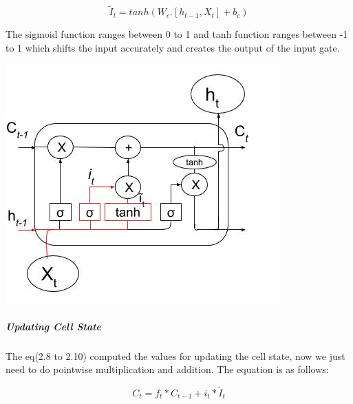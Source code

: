 \begin{equation}
	\tilde{I}_{t} = tanh (W_{c} . [h_{t-1}, X_{t}] + b_{c})	
\end{equation}


The sigmoid function ranges between 0 to 1 and tanh function ranges between -1 to 1 which shifts the input accurately and creates the output of the input gate.

				\begin{center}
				\includegraphics[width=\linewidth]{figures/Input-gate.jpg}	
				\label{fig: Input Gate}
				\end{center}

\subparagraph{Updating Cell State}

The eq(2.8 to 2.10) computed the values for updating the cell state, now we just need to do pointwise multiplication and addition. The equation is as follows:

\begin{equation}
		C_{t} = f_{t} * C_{t-1} + i_{t} * \tilde{I}_{t}
\end{equation}

